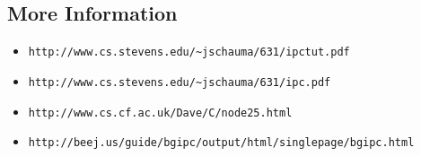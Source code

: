 \documentclass[xga]{xdvislides}
\begin{document}
\subsection{More Information}
\begin{itemize}
	\item \verb+http://www.cs.stevens.edu/~jschauma/631/ipctut.pdf+
	\item \verb+http://www.cs.stevens.edu/~jschauma/631/ipc.pdf+
	\item \verb+http://www.cs.cf.ac.uk/Dave/C/node25.html+
	\item \verb+http://beej.us/guide/bgipc/output/html/singlepage/bgipc.html+
\end{itemize}
\end{document}

